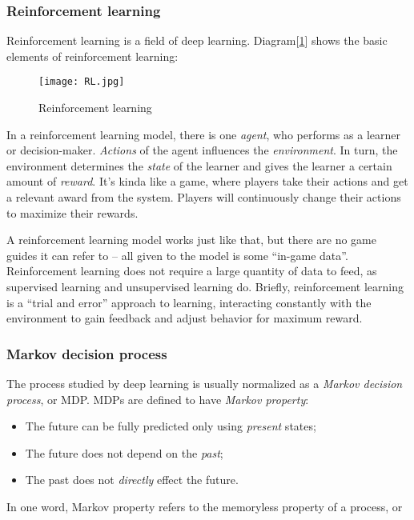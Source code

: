 \documentclass{mcmthesis}
\begin{document}
\subsubsection{Reinforcement learning}

 Reinforcement learning is a field of deep learning.
Diagram[\ref{LA}] shows the basic elements of reinforcement learning:

\begin{figure}[h]
  \small
  \centering
  \texttt{[image: RL.jpg]}
  \caption{Reinforcement learning} \label{LA}
\end{figure}

In a reinforcement learning model, there is one \textit{agent},
who performs as a learner or decision-maker.
\textit{Actions} of the agent influences the \textit{environment}.
In turn, the environment determines the \textit{state} of the learner
and gives the learner a certain amount of \textit{reward}.
It's kinda like a game, where players take their actions and get a relevant award from the system.
Players will continuously change their actions to maximize their rewards.

A reinforcement learning model works just like that,
but there are no game guides it can refer to --
all given to the model is some ``in-game data''.
Reinforcement learning does not require a large quantity of data to feed,
as supervised learning and unsupervised learning do.
Briefly, reinforcement learning is a ``trial and error'' approach to learning,
interacting constantly with the environment to gain feedback and
adjust behavior for maximum reward.

\subsubsection{Markov decision process}

 The process studied by deep learning is usually normalized as a \textit{Markov decision process}, or MDP.
MDPs are defined to have \textit{Markov property}:

\begin{itemize}
  \item The future can be fully predicted only using \textit{present} states;
  \item The future does not depend on the \textit{past};
  \item The past does not \textit{directly} effect the future.
\end{itemize}

In one word, Markov property refers to the memoryless property of a process, or
\end{document}
